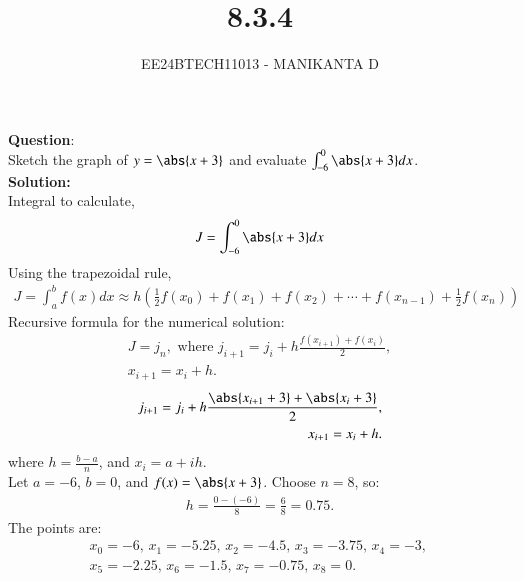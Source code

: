 \documentclass[journal]{IEEEtran}
\begin{document}

\vspace{3cm}

\title{8.3.4}
\author{EE24BTECH11013 - MANIKANTA D}
 \maketitle
{\let\newpage\relax\maketitle}

\renewcommand{\thefigure}{\theenumi}
\renewcommand{\thetable}{\theenumi}
\setlength{\intextsep}{10pt} %


\renewcommand{\thetable}{\theenumi}
\textbf{Question}:\\
Sketch the graph of $y = \abs{x + 3}$ and evaluate $\int_{-6}^{0} \abs{x + 3}dx$.
\\
\textbf{Solution: }\\
Integral to calculate, 
\begin{align}
    J = \int_{-6}^{0} \abs{x + 3}dx
\end{align}
Using the trapezoidal rule,
\begin{align}
    J = \int_a^b f(x)dx \approx h \left(\frac{1}{2}f(x_0) + f(x_1) + f(x_2) + \cdots + f(x_{n-1}) + \frac{1}{2}f(x_n)\right)
\end{align}
Recursive formula for the numerical solution:
\begin{align}
    J = j_n, \text{ where } j_{i+1} = j_i + h \frac{f(x_{i+1}) + f(x_i)}{2}, \\
    x_{i+1} = x_i + h.
\end{align}
\begin{align}
    j_{i+1} = j_i + h \frac{\abs{x_{i+1} + 3} + \abs{x_i + 3}}{2}, \\
    x_{i+1} = x_i + h.
\end{align}
where $h = \frac{b-a}{n}$, and $x_i = a + ih$.\\
Let $a = -6$, $b = 0$, and $f(x) = \abs{x + 3}$. Choose $n = 8$, so:
\begin{align}
    h = \frac{0 - (-6)}{8} = \frac{6}{8} = 0.75.
\end{align}
The points are:
\begin{align}
    x_0 = -6, \, x_1 = -5.25, \, x_2 = -4.5, \, x_3 = -3.75, \, x_4 = -3, \, \\
    x_5 = -2.25, \, x_6 = -1.5, \, x_7 = -0.75, \, x_8 = 0.
\end{align}
\end{document}

